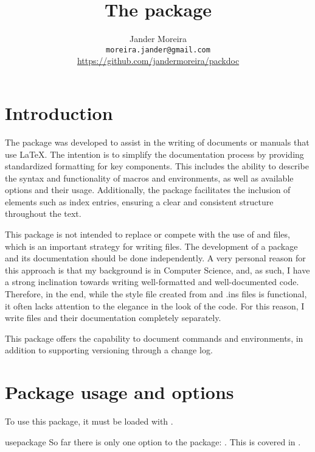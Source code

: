 \documentclass[11pt]{article}
\title{The \PackageName{packdoc} package\\\normalsize\textsf{\PDVersion}}
\author{%
    Jander Moreira\\%
    \texttt{moreira.jander@gmail.com}\\%
    \url{https://github.com/jandermoreira/packdoc}%
}
\date{\PDDate}
\begin{document}
\maketitle
\tableofcontents

\PDPrintChanges


\section{Introduction}

The  package was developed to assist in the writing of documents or manuals that use \LaTeX. The intention is to simplify the documentation process by providing standardized formatting for key components. This includes the ability to describe the syntax and functionality of macros and environments, as well as available options and their usage. Additionally, the package facilitates the inclusion of elements such as index entries, ensuring a clear and consistent structure throughout the text.

This package is not intended to replace or compete with the use of  and  files, which is an important strategy for writing  files. The development of a package and its documentation should be done independently. A very personal reason for this approach is that my background is in Computer Science, and, as such, I have a strong inclination towards writing well-formatted and well-documented code. Therefore, in the end, while the style file created from  and .ins files is functional, it often lacks attention to the elegance in the look of the code. For this reason, I write  files and their documentation completely separately.

This package offers the capability to document commands and environments, in addition to supporting versioning through a change log.


\section{Package usage and options}
To use this package, it must be loaded with .

\begin{Macro*}{usepackage}{}{}
    So far there is only one option to the package: . This is covered in .
\end{Macro*}
\end{document}
